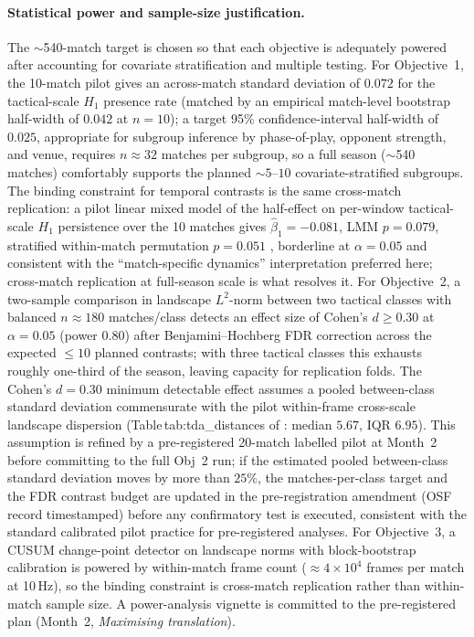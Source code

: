 \paragraph{Statistical power and sample-size justification.}
The $\sim$540-match target is chosen so that each objective is adequately powered after accounting for covariate stratification and multiple testing. For Objective~1, the 10-match pilot \citep{Brown2026} gives an across-match standard deviation of $0.072$ for the tactical-scale $H_1$ presence rate (matched by an empirical match-level bootstrap half-width of $0.042$ at $n=10$); a target 95\% confidence-interval half-width of $0.025$, appropriate for subgroup inference by phase-of-play, opponent strength, and venue, requires $n \approx 32$ matches per subgroup, so a full season ($\sim$540 matches) comfortably supports the planned ${\sim}5$--$10$ covariate-stratified subgroups. The binding constraint for temporal contrasts is the same cross-match replication: a pilot linear mixed model of the half-effect on per-window tactical-scale $H_1$ persistence over the 10 matches gives $\hat\beta_1=-0.081$, LMM $p=0.079$, stratified within-match permutation $p=0.051$ \citep{Brown2026}, borderline at $\alpha=0.05$ and consistent with the ``match-specific dynamics'' interpretation preferred here; cross-match replication at full-season scale is what resolves it. For Objective~2, a two-sample comparison in landscape $L^2$-norm between two tactical classes with balanced $n \approx 180$ matches/class detects an effect size of Cohen's $d \ge 0.30$ at $\alpha=0.05$ (power $0.80$) after Benjamini--Hochberg FDR correction \citep{BenjaminiHochberg1995} across the expected $\le 10$ planned contrasts; with three tactical classes this exhausts roughly one-third of the season, leaving capacity for replication folds. The Cohen's $d=0.30$ minimum detectable effect assumes a pooled between-class standard deviation commensurate with the pilot within-frame cross-scale landscape dispersion (Table\,tab:tda\_distances of \citealp{Brown2026}: median $5.67$, IQR $6.95$). This assumption is refined by a pre-registered 20-match labelled pilot at Month~2 before committing to the full Obj~2 run; if the estimated pooled between-class standard deviation moves by more than $25\%$, the matches-per-class target and the FDR contrast budget are updated in the pre-registration amendment (OSF record timestamped) before any confirmatory test is executed, consistent with the standard calibrated pilot practice for pre-registered analyses. For Objective~3, a CUSUM change-point detector on landscape norms with block-bootstrap calibration is powered by within-match frame count ($\approx 4\times 10^{4}$ frames per match at 10\,Hz), so the binding constraint is cross-match replication rather than within-match sample size. A power-analysis vignette is committed to the pre-registered plan (Month~2, \emph{Maximising translation}).

